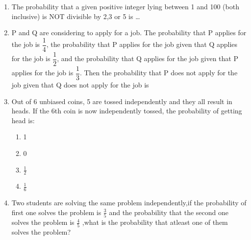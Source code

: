 \renewcommand{\theequation}{\theenumi}
\renewcommand{\thefigure}{\theenumi}
\renewcommand{\thetable}{\theenumi}
\begin{enumerate}[label=\thesection.\arabic*.,ref=\thesection.\theenumi]

\item The probability that a given positive integer lying between 1 and 100 (both inclusive) is NOT divisible by 2,3 or 5 is \dots
\\
\solution

%
\item P and Q are considering to apply for a job. The probability that P applies for the job is $\dfrac{1}{4}$, the probability that P applies for the job given that Q applies for the job is $\dfrac{1}{2}$, and the probability that Q applies for the job given that P applies for the job is $\dfrac{1}{3}$. Then the probability that P does not apply for the job given that Q does not apply for the job is 

\begin{enumerate}
\end{enumerate}
\solution

%
%
\item Out of 6 unbiased coins, 5 are tossed independently and they all result in heads. If the 6th coin is now independently tossed, the probability of getting head is:
\begin{enumerate}[label=(\alph*)]
\item 1
\item 0
\item $\frac{1}{2}$
\item $\frac{1}{6}$
\end{enumerate}
%
\solution


\item Two students are solving the same problem independently,if the probability of first one solves the problem is $\frac{3}{5}$ and the probability that the second one solves the problem is $\frac{4}{5}$ ,what is the probability that atleast one of them solves the problem?
\begin{enumerate}


\end{enumerate}
\end{enumerate}
